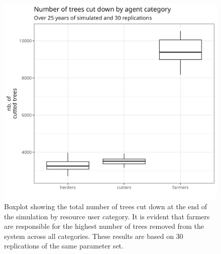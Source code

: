 \documentclass{article}
\begin{document}
 \begin{figure}
    \centering
    \includegraphics[width=\textwidth]{./img/rep_treeKilled.png}
    \caption{Boxplot showing the total number of trees cut down at the end of the simulation by resource user category. It is evident that farmers are responsible for the highest number of trees removed from the system across all categories. These results are based on 30 replications of the same parameter set.}
    \label{fig:treeKilled}
\end{figure}

\end{document}
